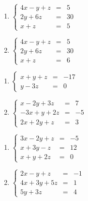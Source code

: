\begin{multicols}{2}
\begin{enumerate}
\setcounter{enumi}{\value{HW}}


\item \label{dependentsystemmuliple} $\left\{ \begin{array}{rcr} 4x - y + z & = & 5 \\ 2y + 6z & = & 30 \\ x + z & = & 5  \end{array} \right.$
\item $\left\{ \begin{array}{rcr} 4x - y + z & = & 5 \\ 2y + 6z & = & 30 \\ x + z & = & 6  \end{array} \right.$

\setcounter{HW}{\value{enumi}}
\end{enumerate}
\end{multicols}



\begin{multicols}{2}
\begin{enumerate}
\setcounter{enumi}{\value{HW}}

\item $\left\{ \begin{array}{rcr} x + y + z & = & -17  \\ y - 3z & = & 0  \end{array} \right.$


\item $\left\{ \begin{array}{rcr} x-2y+3z & = & 7 \\ -3x+y+2z & = & -5 \\ 2x+2y+z & = & 3  \end{array} \right.$


\setcounter{HW}{\value{enumi}}
\end{enumerate}
\end{multicols}



\begin{multicols}{2}
\begin{enumerate}
\setcounter{enumi}{\value{HW}}


\item $\left\{ \begin{array}{rcr} 3x-2y+z & = & -5 \\ x+3y-z & = & 12 \\ x+y+2z & = & 0  \end{array} \right.$
\item $\left\{ \begin{array}{rcr} 2x-y+z& = & -1 \\ 4x+3y+5z & = & 1 \\  5y+3z & = & 4 \end{array} \right.$


\setcounter{HW}{\value{enumi}}
\end{enumerate}
\end{multicols}



